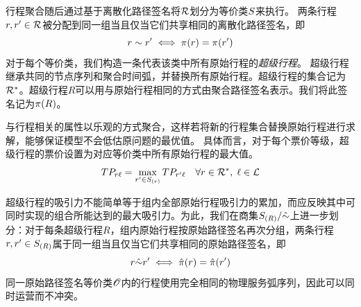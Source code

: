 行程聚合随后通过基于离散化路径签名将$\mathcal{R}$划分为等价类$S$来执行。
两条行程$r,r' \in \mathcal{R}$被分配到同一组当且仅当它们共享相同的离散化路径签名，即
\[
r \sim r' \iff \pi({r}) = \pi({r'})
\]
对于每个等价类，我们构造一条代表该类中所有原始行程的\emph{超级行程}。
超级行程继承共同的节点序列和聚合时间弧，并替换所有原始行程。超级行程的集合记为$\mathcal{R}^{*}$。超级行程$R$可以用与原始行程相同的方式由聚合路径签名表示。我们将此签名记为$\pi({R})$。

与行程相关的属性以乐观的方式聚合，这样若将新的行程集合替换原始行程进行求解，能够保证模型不会低估原问题的最优值。
具体而言，对于每个票价等级，超级行程的票价设置为对应等价类中所有原始行程的最大值。
\begin{equation}
TP_{r\ell} = \max_{r' \in S_{(r)}} TP_{r'\ell} \quad \forall r \in \mathcal{R}^{*}, \; \ell \in \mathcal{L}
\end{equation}

超级行程的吸引力不能简单等于组内全部原始行程吸引力的累加，而应反映其中可同时实现的组合所能达到的最大吸引力。为此，我们在商集$S_{(R)} /\hat{\sim}$上进一步划分：对于每条超级行程$R$，组内原始行程按原始路径签名再次分组，两条行程$r,r' \in S_{(R)}$属于同一组当且仅当它们共享相同的原始路径签名，即
\[r \hat{\sim} r' \iff \hat{\pi}({r}) = \hat{\pi}({r'})\]
同一原始路径签名等价类$\mathscr{O}$内的行程使用完全相同的物理服务弧序列，因此可以同时运营而不冲突。

